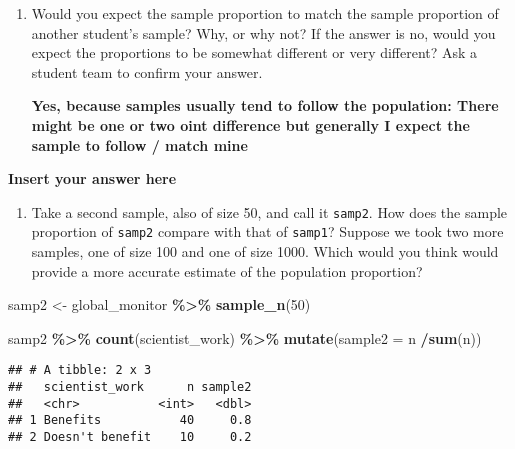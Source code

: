 \documentclass[
]{article}
\newenvironment{Shaded}{\begin{snugshade}}{\end{snugshade}}
\newcommand{\AttributeTok}[1]{\textcolor[rgb]{0.13,0.29,0.53}{#1}}
\newcommand{\DecValTok}[1]{\textcolor[rgb]{0.00,0.00,0.81}{#1}}
\newcommand{\FunctionTok}[1]{\textcolor[rgb]{0.13,0.29,0.53}{\textbf{#1}}}
\newcommand{\NormalTok}[1]{#1}
\newcommand{\OtherTok}[1]{\textcolor[rgb]{0.56,0.35,0.01}{#1}}
\newcommand{\SpecialCharTok}[1]{\textcolor[rgb]{0.81,0.36,0.00}{\textbf{#1}}}
\providecommand{\tightlist}{%
  \setlength{\itemsep}{0pt}\setlength{\parskip}{0pt}}
\begin{document}
\begin{enumerate}
\def\labelenumi{\arabic{enumi}.}
\setcounter{enumi}{1}
\item
  Would you expect the sample proportion to match the sample proportion
  of another student's sample? Why, or why not? If the answer is no,
  would you expect the proportions to be somewhat different or very
  different? Ask a student team to confirm your answer.

  \textbf{Yes, because samples usually tend to follow the population:
  There might be one or two oint difference but generally I expect the
  sample to follow / match mine}
\end{enumerate}

\textbf{Insert your answer here}

\begin{enumerate}
\def\labelenumi{\arabic{enumi}.}
\setcounter{enumi}{2}
\tightlist
\item
  Take a second sample, also of size 50, and call it \texttt{samp2}. How
  does the sample proportion of \texttt{samp2} compare with that of
  \texttt{samp1}? Suppose we took two more samples, one of size 100 and
  one of size 1000. Which would you think would provide a more accurate
  estimate of the population proportion?
\end{enumerate}

\begin{Shaded}
\begin{Highlighting}[]
\NormalTok{samp2 }\OtherTok{\textless{}{-}}\NormalTok{ global\_monitor }\SpecialCharTok{\%\textgreater{}\%}
  \FunctionTok{sample\_n}\NormalTok{(}\DecValTok{50}\NormalTok{)}
\end{Highlighting}
\end{Shaded}

\begin{Shaded}
\begin{Highlighting}[]
\NormalTok{samp2 }\SpecialCharTok{\%\textgreater{}\%}
  \FunctionTok{count}\NormalTok{(scientist\_work) }\SpecialCharTok{\%\textgreater{}\%}
  \FunctionTok{mutate}\NormalTok{(}\AttributeTok{sample2 =}\NormalTok{ n }\SpecialCharTok{/}\FunctionTok{sum}\NormalTok{(n))}
\end{Highlighting}
\end{Shaded}

\begin{verbatim}
## # A tibble: 2 x 3
##   scientist_work      n sample2
##   <chr>           <int>   <dbl>
## 1 Benefits           40     0.8
## 2 Doesn't benefit    10     0.2
\end{verbatim}
\end{document}
